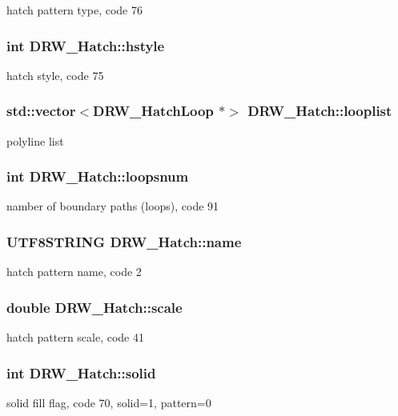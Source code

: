 hatch pattern type, code 76 \hypertarget{classDRW__Hatch_a7b8950911e5fb319f0d63b7ee2251f87}{
\subsubsection[{hstyle}]{\setlength{\rightskip}{0pt plus 5cm}int D\-R\-W\-\_\-\-Hatch\-::hstyle}}\label{classDRW__Hatch_a7b8950911e5fb319f0d63b7ee2251f87}
hatch style, code 75 \hypertarget{classDRW__Hatch_a258a13a2da31ae31fd22e2da3757da5c}{
\subsubsection[{looplist}]{\setlength{\rightskip}{0pt plus 5cm}std\-::vector$<${\bf D\-R\-W\-\_\-\-Hatch\-Loop} $\ast$$>$ D\-R\-W\-\_\-\-Hatch\-::looplist}}\label{classDRW__Hatch_a258a13a2da31ae31fd22e2da3757da5c}
polyline list \hypertarget{classDRW__Hatch_a52ba4f38bba83fe735cb14447e256260}{
\subsubsection[{loopsnum}]{\setlength{\rightskip}{0pt plus 5cm}int D\-R\-W\-\_\-\-Hatch\-::loopsnum}}\label{classDRW__Hatch_a52ba4f38bba83fe735cb14447e256260}
namber of boundary paths (loops), code 91 \hypertarget{classDRW__Hatch_a3e864b79a0757b7ab2a8c32a21165150}{
\subsubsection[{name}]{\setlength{\rightskip}{0pt plus 5cm}U\-T\-F8\-S\-T\-R\-I\-N\-G D\-R\-W\-\_\-\-Hatch\-::name}}\label{classDRW__Hatch_a3e864b79a0757b7ab2a8c32a21165150}
hatch pattern name, code 2 \hypertarget{classDRW__Hatch_a0ee3311f6d41385488af2cafd55cd7ef}{
\subsubsection[{scale}]{\setlength{\rightskip}{0pt plus 5cm}double D\-R\-W\-\_\-\-Hatch\-::scale}}\label{classDRW__Hatch_a0ee3311f6d41385488af2cafd55cd7ef}
hatch pattern scale, code 41 \hypertarget{classDRW__Hatch_a4eec0fc3cd839a3892e875bcc9789d48}{
\subsubsection[{solid}]{\setlength{\rightskip}{0pt plus 5cm}int D\-R\-W\-\_\-\-Hatch\-::solid}}\label{classDRW__Hatch_a4eec0fc3cd839a3892e875bcc9789d48}
solid fill flag, code 70, solid=1, pattern=0 

